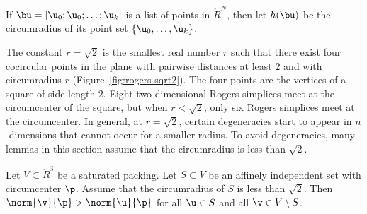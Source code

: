 \begin{definition}[h]
% 
If $\bu=[\u_0;\u_0;\ldots;\u_k]$ is a list of points in $\ring{R}^N$, then
let $h(\bu)$ be the
circumradius of its point set $\{ \u_0,\ldots, \u_k\}$.
\end{definition}
%

\begin{remark}
The constant $r=\sqrt2$ is the smallest real number $r$ such that
there exist four cocircular points in the plane with pairwise
distances at least $2$ and with circumradius $r$ (Figure~\ref{fig:rogers-sqrt2}).  
The four points are
the vertices of a square of side length $2$.  Eight two-dimensional Rogers simplices
meet at the circumcenter of the square, but when $r<\sqrt2$, only six
Rogers simplices meet at the circumcenter.  In general, at $r=\sqrt2$,
certain degeneracies start to appear in $n$-dimensions that cannot occur for a smaller
radius.  To avoid degeneracies, many lemmas in this section
assume that the circumradius is less than $\sqrt2$.
\end{remark}

\figNOCHOTB %

\begin{lemma}[nondegeneracy]\label{lemma:sqrt2-close} 
  Let $V\subset\ring{R}^3$ be a saturated packing.  Let $S\subset V$
  be an affinely independent set with circumcenter $\p$.  Assume that
  the circumradius of $S$ is less than $\sqrt2$.  Then
  $\norm{\v}{\p}>\norm{\u}{\p}$ for all $\u\in S$ and all $\v\in
  V\setminus S$.
\end{lemma}

